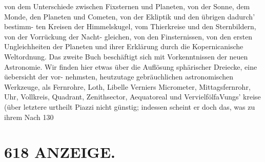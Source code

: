 \documentclass[12pt,a4paper]{article}
\begin{document}
{{{{{{{{von  dem  Unterschiede  zwischen  Fixsternen  und  Planeten,  von  der Sonne,  dem  Monde,  den  Planeten  und  Cometen,  von  der  Ekliptik  und  den  übrigen  dadurch' bestimm- ten Kreisen  der  Himmelskugel,  vom  Thierkreise  und  den  Sternbildern,  von  der  Vorrückung  der  Nacht- gleichen, von  den  Finsternissen,  von  den  ersten  Ungleichheiten  der  Planeten  und  ihrer  Erklärung  durch die  Kopernicanische  Weltordnung.  Das  zweite  Buch  beschäftigt  sich  mit  Vorkenntnissen  der  neuen Astronomie.  Wir  finden  hier  etwas  über  die  Auflösung  sphärischer  Dreiecke,  eine  üebersicht  der  vor- nehmsten, heutzutage  gebräuchlichen  astronomischen  Werkzeuge,  als  Fernrohre,  Loth,  Libelle  Verniers Micrometer,  Mittagsfernrohr,  Uhr,  Vollkreis,  Quadrant,  Zenithsector,  Aequatoreal  und  VervielfölfaVungs' kreise  (über  letztere  urtheilt  Piazzi  nicht  günstig;    indessen  scheint  er  doch  das,  was   zu    ihrem  Nach 130


\section*{618  ANZEIGE.}

}}}}}}}}
\end{document}
